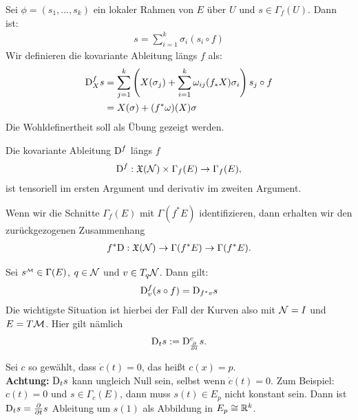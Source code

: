 \begin{defs}
Sei $\phi = (s_1, \dots, s_k)$ ein lokaler Rahmen von $E$ über $U$ und $s \in \Gamma_f (U)$. 
Dann ist:
\begin{align}
s = \sum^{k}_{i=1} \sigma_i (s_i \circ f)
\end{align}
Wir definieren die kovariante Ableitung längs $f$ als:
\begin{align}
\mathrm{D}^{f}_X s &= \sum^k_{j=1} \left( X(\sigma_j) + \sum^k_{i=1} \omega_{ij}(f_\ast X)\sigma_i \right) s_j \circ f\\
&= X(\sigma) + (f^\ast \omega)(X) \sigma
\end{align}
Die Wohldefinertheit soll als Übung gezeigt werden.
\end{defs}
\begin{satz}
Die kovariante Ableitung $\mathrm{D}^f$ längs $f$
\begin{align}
\mathrm{D}^f: \mathfrak{X}(\mathcal{N}) \times \Gamma_f (E) \to \Gamma_f (E),
\end{align}
ist tensoriell im ersten Argument und derivativ im zweiten Argument.
\end{satz}
Wenn wir die Schnitte $\Gamma_f (E)$ mit $\Gamma(f^\ast E)$ identifizieren, dann erhalten wir den zurückgezogenen Zusammenhang
\begin{align}
f^\ast \mathrm{D} : \mathfrak{X}(\mathcal{N}) \to \Gamma(f^\ast E) \to \Gamma(f^\ast E).
\end{align}
\begin{satz}
Sei $s^\text{{\begin{tiny}$\mfk$\end{tiny}}} \in \Gamma(E)$, $q \in \mathcal{N}$ und $v\in T_q \mathcal{N}$.
Dann gilt:
\begin{align}
\mathrm{D}^f_v (s\circ f) = \mathrm{D}_{f^\ast v} s
\end{align}
Die wichtigste Situation ist hierbei der Fall der Kurven also mit $\mathcal{N} = I$ und $E = T\mathcal{M}$.
Hier gilt nämlich
\begin{align}
\mathrm{D}_t s := \mathrm{D}^c_{\pdv{t}} s.
\end{align}
\end{satz}
\begin{bem}
Sei $c$ so gewählt, dass $\dot{c}(t) = 0$, das heißt $c(x)=p$.\\
\textbf{Achtung:} $\mathrm{D}_t s$ kann ungleich Null sein, selbst wenn $\dot{c}(t) = 0$.
Zum Beispiel: $c(t)=0$ und $s \in \Gamma_c (E)$, dann muss $s(t) \in E_p$ nicht konstant sein.
Dann ist $\mathrm{D}_t s = \pdv{t} s $ Ableitung um $s(1)$ als Abbildung in $E_p \cong \mathbb{R}^k$.
\end{bem}
